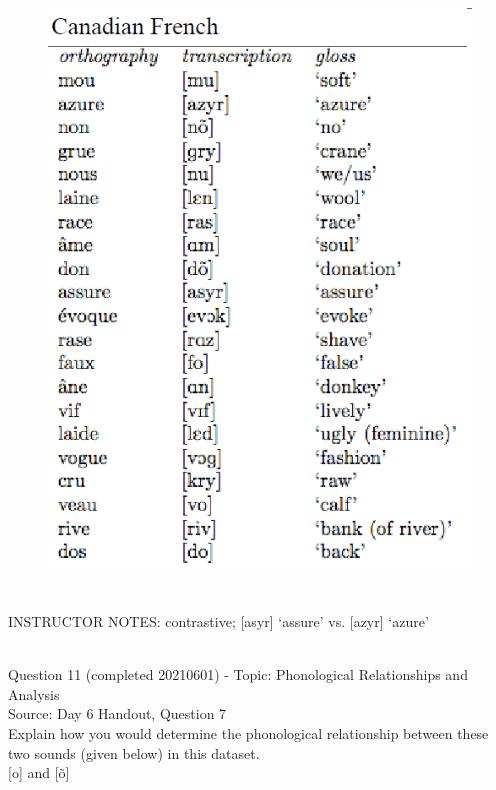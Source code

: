 \documentclass[12pt]{article}
\begin{document}
\begin{figure}[H]
\includegraphics{../images/canadianfrench.png}
\end{figure}

~\\
INSTRUCTOR NOTES: contrastive; [asyr] ‘assure’ vs. [azyr] ‘azure’


~\\

{\large Question 11} (completed 20210601) - Topic: Phonological Relationships and Analysis\\
Source: Day 6 Handout, Question 7\\

Explain how you would determine the phonological relationship between these two sounds (given below) in this dataset.\\

{[o]} and {[õ]}
\end{document}
